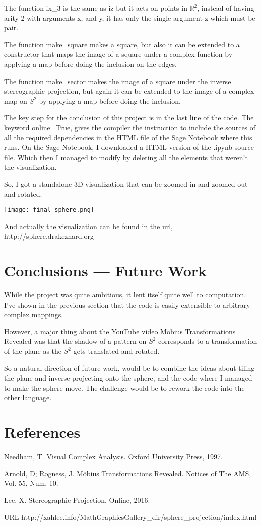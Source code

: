 \documentclass{article}
\newcommand\R{\mathbb{R}}
\begin{document}
The function ix\_3 is the same as iz but it acts on points in $\R^2$,
instead of having arity 2 with arguments x, and y, it has only the
single argument z which must be pair.

The function make\_square makes a square, but also it can be extended
to a constructor that maps the image of a square under a complex
function by applying a map before doing the inclusion on the edges.

The function make\_sector makes the image of a square under the inverse
stereographic projection, but again it can be extended to the image of
a complex map on $S^2$ by applying a map before doing the
inclusion.

The key step for the conclusion of this project is in the last line of
the code. The keyword online=True, gives the compiler the instruction
to include the sources of all the required dependencies in the HTML
file of the Sage Notebook where this runs. On the Sage Notebook, I
downloaded a HTML version of the .ipynb source file. Which then I
managed to modify by deleting all the elements that weren't the
visualization.

So, I got a standalone $3$D visualization that can be
zoomed in and zoomed out and rotated.

\begin{center}
  \texttt{[image: final-sphere.png]}
  \end{center}

And actually the visualization can be found in the url, http://sphere.drakezhard.org

\section{Conclusions --- Future Work}

While the project was quite ambitious, it lent itself quite well to
computation. I've shown in the previous section that the code is
easily extensible to arbitrary complex mappings.

However, a major
thing about the YouTube video M\"obius Transformations Revealed was
that the shadow of a pattern on $S^2$ corresponds to a transformation
of the plane as the $S^2$ gets translated and rotated.

So a natural direction of future work, would be to combine the ideas
about tiling the plane and inverse projecting onto the sphere, and the
code where I managed to make the sphere move. The challenge would be
to rework the code into the other language.

\section{References}

Needham, T.  Visual Complex Analysis. Oxford University Press, 1997.

Arnold, D; Rogness, J.  Möbius Transformations Revealed. Notices of
The AMS, Vol. 55, Num. 10.

Lee, X. Stereographic Projection. Online, 2016.

\hspace{3 em} URL http://xahlee.info/MathGraphicsGallery\_dir/sphere\_projection/index.html
\end{document}

